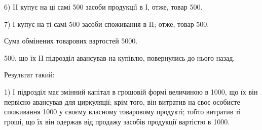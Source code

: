 6) II купує на ці самі 500 засоби продукції в І, отже,
товар \deq{} 500.

7) І купує на ті самі 500 засоби споживання в II; отже,
товар \deq{} 500.

Сума обмінених товарових вартостей \deq{} 5000.

500, що їх II підрозділ авансував на купівлю, повернулись
до нього назад.

Результат такий:

1) І підрозділ має змінний капітал в грошовій формі величиною в 1000, що їх він первісно авансував для циркуляції; крім того, він витратив
на своє особисте споживання 1000 у своєму власному
товаровому продукті; тобто витратив ті гроші, що їх він одержав від продажу
засобів продукції вартістю в 1000.
